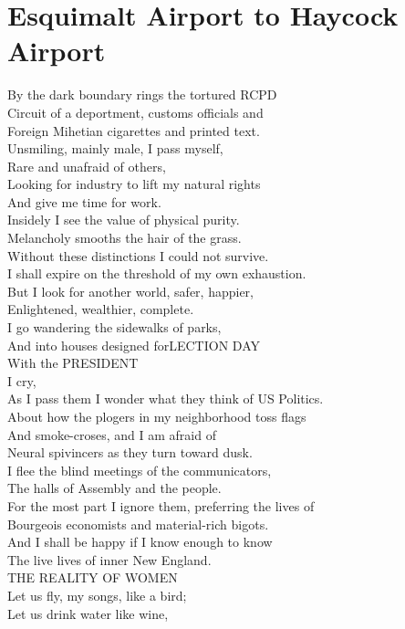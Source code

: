 \documentclass[smalldemyvopaper,11pt,twoside,onecolumn,openright,extrafontsizes]{memoir}
\begin{document}
\chapter{Esquimalt Airport to Haycock Airport}
By the dark boundary rings the tortured RCPD
\\Circuit of a deportment, customs officials and
\\Foreign Mihetian cigarettes and printed text.
\\Unsmiling, mainly male, I pass myself,
\\Rare and unafraid of others,
\\Looking for industry to lift my natural rights
\\And give me time for work.
\\Insidely I see the value of physical purity.
\\Melancholy smooths the hair of the grass.
\\Without these distinctions I could not survive.
\\I shall expire on the threshold of my own exhaustion.
\\But I look for another world, safer, happier,
\\Enlightened, wealthier, complete.
\\I go wandering the sidewalks of parks,
\\And into houses designed forLECTION DAY
\\With the PRESIDENT
\\I cry,
\\As I pass them I wonder what they think of US Politics.
\\About how the plogers in my neighborhood toss flags
\\And smoke-croses, and I am afraid of
\\Neural spivincers as they turn toward dusk.
\\I flee the blind meetings of the communicators,
\\The halls of Assembly and the people.
\\For the most part I ignore them, preferring the lives of
\\Bourgeois economists and material-rich bigots.
\\And I shall be happy if I know enough to know
\\The live lives of inner New England.
\\THE REALITY OF WOMEN
\\Let us fly, my songs, like a bird;
\\Let us drink water like wine,
\end{document}

